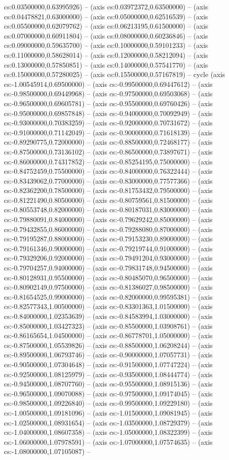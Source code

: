 cs:0.03500000,0.63995926) -- (axis cs:0.03972372,0.63500000) -- (axis cs:0.04478821,0.63000000) -- (axis cs:0.05000000,0.62516539) -- (axis cs:0.05500000,0.62079762) -- (axis cs:0.06213195,0.61500000) -- (axis cs:0.07000000,0.60911804) -- (axis cs:0.08000000,0.60236846) -- (axis cs:0.09000000,0.59635700) -- (axis cs:0.10000000,0.59101233) -- (axis cs:0.11000000,0.58628014) -- (axis cs:0.12000000,0.58212094) -- (axis cs:0.13000000,0.57850851) -- (axis cs:0.14000000,0.57541770) -- (axis cs:0.15000000,0.57280025) -- (axis cs:0.15500000,0.57167819) -- cycle (axis cs:-1.00545914,0.69500000) -- (axis cs:-0.99500000,0.69447612) -- (axis cs:-0.98500000,0.69449968) -- (axis cs:-0.97500000,0.69503068) -- (axis cs:-0.96500000,0.69605781) -- (axis cs:-0.95500000,0.69760426) -- (axis cs:-0.95000000,0.69857848) -- (axis cs:-0.94000000,0.70092949) -- (axis cs:-0.93000000,0.70383259) -- (axis cs:-0.92000000,0.70731672) -- (axis cs:-0.91000000,0.71142049) -- (axis cs:-0.90000000,0.71618139) -- (axis cs:-0.89290775,0.72000000) -- (axis cs:-0.88500000,0.72468177) -- (axis cs:-0.87500000,0.73136102) -- (axis cs:-0.86500000,0.73897671) -- (axis cs:-0.86000000,0.74317852) -- (axis cs:-0.85254195,0.75000000) -- (axis cs:-0.84752459,0.75500000) -- (axis cs:-0.84000000,0.76322444) -- (axis cs:-0.83439062,0.77000000) -- (axis cs:-0.83000000,0.77577366) -- (axis cs:-0.82362200,0.78500000) -- (axis cs:-0.81753432,0.79500000) -- (axis cs:-0.81221490,0.80500000) -- (axis cs:-0.80759561,0.81500000) -- (axis cs:-0.80553748,0.82000000) -- (axis cs:-0.80187031,0.83000000) -- (axis cs:-0.79880091,0.84000000) -- (axis cs:-0.79629242,0.85000000) -- (axis cs:-0.79432855,0.86000000) -- (axis cs:-0.79288080,0.87000000) -- (axis cs:-0.79195287,0.88000000) -- (axis cs:-0.79153230,0.89000000) -- (axis cs:-0.79161346,0.90000000) -- (axis cs:-0.79219744,0.91000000) -- (axis cs:-0.79329206,0.92000000) -- (axis cs:-0.79491204,0.93000000) -- (axis cs:-0.79704257,0.94000000) -- (axis cs:-0.79831748,0.94500000) -- (axis cs:-0.80128931,0.95500000) -- (axis cs:-0.80485070,0.96500000) -- (axis cs:-0.80902149,0.97500000) -- (axis cs:-0.81386027,0.98500000) -- (axis cs:-0.81654525,0.99000000) -- (axis cs:-0.82000000,0.99595381) -- (axis cs:-0.82577343,1.00500000) -- (axis cs:-0.83301363,1.01500000) -- (axis cs:-0.84000000,1.02353639) -- (axis cs:-0.84583994,1.03000000) -- (axis cs:-0.85000000,1.03427323) -- (axis cs:-0.85500000,1.03908761) -- (axis cs:-0.86165654,1.04500000) -- (axis cs:-0.86778701,1.05000000) -- (axis cs:-0.87500000,1.05539826) -- (axis cs:-0.88500000,1.06208244) -- (axis cs:-0.89500000,1.06793746) -- (axis cs:-0.90000000,1.07057731) -- (axis cs:-0.90500000,1.07304648) -- (axis cs:-0.91500000,1.07747224) -- (axis cs:-0.92500000,1.08125979) -- (axis cs:-0.93500000,1.08444774) -- (axis cs:-0.94500000,1.08707760) -- (axis cs:-0.95500000,1.08915136) -- (axis cs:-0.96500000,1.09070088) -- (axis cs:-0.97500000,1.09174045) -- (axis cs:-0.98500000,1.09226840) -- (axis cs:-0.99500000,1.09229180) -- (axis cs:-1.00500000,1.09181096) -- (axis cs:-1.01500000,1.09081945) -- (axis cs:-1.02500000,1.08931654) -- (axis cs:-1.03500000,1.08729379) -- (axis cs:-1.04000000,1.08607358) -- (axis cs:-1.05000000,1.08322399) -- (axis cs:-1.06000000,1.07978591) -- (axis cs:-1.07000000,1.07574635) -- (axis cs:-1.08000000,1.07105087) -- 